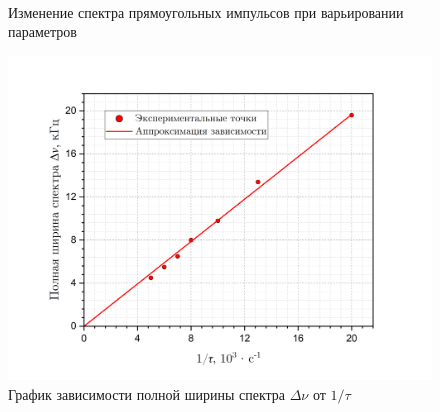 \documentclass[a4paper, 12pt]{article}
\begin{document}
\begin{figure}[H]
         \\
        \caption{Изменение спектра прямоугольных импульсов при варьировании параметров}
        \label{spectrum_A}
    \end{figure} 

    \begin{figure}[H]
        \centering
        \includegraphics[width = 14 cm]{images/graph_nu_tau.png}
        \caption{График зависимости полной ширины спектра $\Delta \nu$ от $1/\tau$}
        \label{graph:nu_tau}
    \end{figure}
\end{document}
